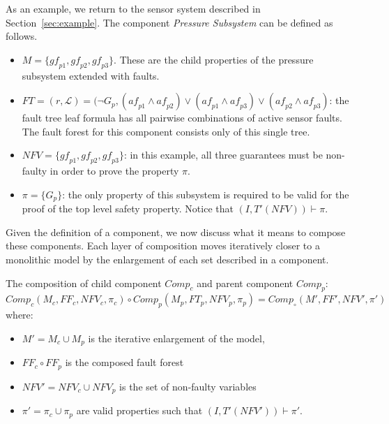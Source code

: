 As an example, we return to the sensor system described in Section~\ref{sec:example}. The component {\em Pressure Subsystem} can be defined as follows. 

\begin{itemize}[label=\textbullet]
\item $M = \{\mathit{gf}_{p1}, \mathit{gf}_{p2}, \mathit{gf}_{p3}\}$. These are the child properties of the pressure subsystem extended with faults. 
\item $\mathit{FT} = (r, \mathcal{L}) = (\neg G_p, (\mathit{af}_{p1} \land \mathit{af}_{p2}) \lor (\mathit{af}_{p1} \land \mathit{af}_{p3}) \lor (\mathit{af}_{p2} \land \mathit{af}_{p3}) $: the fault tree leaf formula has all pairwise combinations of active sensor faults. The fault forest for this component consists only of this single tree.
\item $\mathit{NFV} = \{\mathit{gf}_{p1}, \mathit{gf}_{p2}, \mathit{gf}_{p3}\}$: in this example, all three guarantees must be non-faulty in order to prove the property $\pi$.
\item $\pi = \{G_p\}$: the only property of this subsystem is required to be valid for the proof of the top level safety property. Notice that $(I, T'(\mathit{NFV})) \vdash \pi$.
\end{itemize}


Given the definition of a component, we now discuss what it means to compose these components. Each layer of composition moves iteratively closer to a monolithic model by the enlargement of each set described in a component. 

\begin{definition}
The composition of child component $\mathit{Comp}_c$ and parent component $\mathit{Comp}_p$:
$Comp_c(M_c, \mathit{FF}_c, \mathit{NFV}_c, \pi_c) \circ Comp_p(M_p, \mathit{FT}_p, \mathit{NFV}_p, \pi_p) = Comp_\circ(M', \mathit{FF}', \mathit{NFV}', \pi')$ where:
\begin{itemize}[label=\textbullet]
\item $M' = M_c \cup M_p$ is the iterative enlargement of the model,
\item $\mathit{FF}_c \circ \mathit{FF}_p$ is the composed fault forest
\item $\mathit{NFV}' = \mathit{NFV}_c \cup \mathit{NFV}_p$ is the set of non-faulty variables
\item $\pi' = \pi_c \cup \pi_p$ are valid properties such that $(I, T'(\mathit{NFV}')) \vdash \pi'$.
\end{itemize}
\end{definition}


